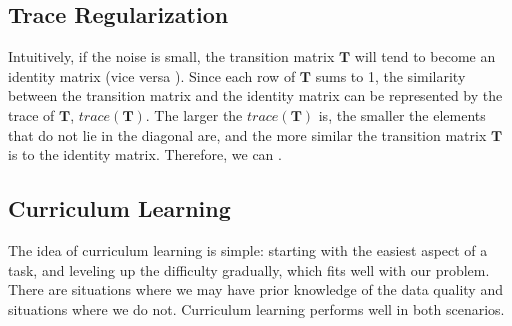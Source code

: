 
\subsection{Trace Regularization}
Intuitively, if the noise is small, the transition matrix $\mathbf{T}$ will tend to become an identity matrix (vice versa ).  Since each row of $\mathbf{T}$ sums to 1, the similarity between the transition matrix and the identity matrix can be represented by the trace of $\mathbf{T}$, $trace(\mathbf{T})$. The larger the $trace(\mathbf{T})$ is, the smaller the elements that do not lie in the diagonal are, and the more similar the transition matrix $\mathbf{T}$ is to the identity matrix. Therefore, we can . 

\subsection{Curriculum Learning}
The idea of curriculum learning is simple: starting with the easiest aspect of a task, and leveling up the difficulty gradually,
which fits well with our problem.
There are situations where we may have prior knowledge of the data quality and situations where we do not. 
Curriculum learning performs well in both scenarios.  

